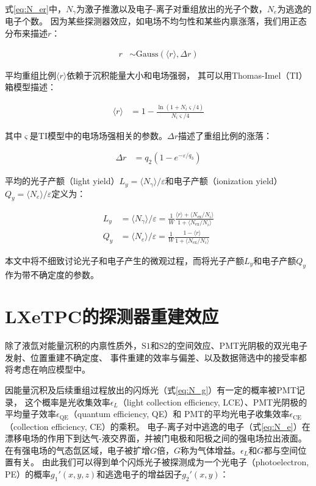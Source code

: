 式\ref{eq:N_er}中，$N_\gamma$为激子推激以及电子-离子对重组放出的光子个数，$N_{e}$为逃逸的电子个数。
因为某些探测器效应，如电场不均匀性和某些内禀涨落\cite{lux_collaboration_tritium_2016}，我们用正态分布来描述$r$：

\begin{align}
    \label{eq:r}
    r &\sim \mathrm{Gauss}\left(\langle r\rangle,\Delta r\right)
\end{align}

平均重组比例$\langle r\rangle$依赖于沉积能量大小和电场强弱，
其可以用Thomas-Imel（TI）箱模型描述\cite{thomas_recombination_1987}：

\begin{align}
    \label{eq:mr}
    \langle r\rangle &= 1 - \frac{\ln{\left(1+N_i\varsigma/4\right)}}{N_i\varsigma/4}
\end{align}

其中$\varsigma$是TI模型中的电场场强相关的参数。$\Delta r$描述了重组比例的涨落：

\begin{align}
    \label{eq:sr}
    \Delta r &= q_2\left(1-e^{-\varepsilon /q_3}\right)
\end{align}

平均的光子产额（light yield）$L_y=\langle N_\gamma\rangle/\varepsilon $和电子产额（ionization yield）$Q_y=\langle N_e\rangle/\varepsilon $定义为：

\begin{align}
    \label{eq:N_g}
    L_y &= \langle N_\gamma\rangle/\varepsilon  = \frac{1}{W}\frac{\langle r\rangle+\langle N_{\mathrm{ex}}/N_i\rangle}{1+\langle N_{\mathrm{ex}}/N_i\rangle} \\
    \label{eq:N_e}
    Q_y &= \langle N_e\rangle/\varepsilon  = \frac{1}{W}\frac{1-\langle r\rangle}{1+\langle N_{\mathrm{ex}}/N_i\rangle}
\end{align}

本文中将不细致讨论光子和电子产生的微观过程，而将光子产额$L_y$和电子产额$Q_y$作为带不确定度的参数。

\section{LXeTPC的探测器重建效应}

除了液氙对能量沉积的内禀性质外，$\mathrm{S1}$和$\mathrm{S2}$的空间效应、PMT光阴极的双光电子发射、位置重建不确定度、
事件重建的效率与偏差、以及数据筛选中的接受率都将考虑在响应模型中。

因能量沉积及后续重组过程放出的闪烁光（式\ref{eq:N_g}）有一定的概率被PMT记录，
这个概率是光收集效率$\epsilon_L$（light collection efficiency, LCE）、PMT光阴极的平均量子效率$\epsilon_{\mathrm{QE}}$（quantum efficiency, QE）和
PMT的平均光电子收集效率$\epsilon_{\mathrm{CE}}$（collection efficiency, CE）的乘积。
电子-离子对中逃逸的电子（式\ref{eq:N_e}）在漂移电场的作用下到达气-液交界面，并被门电极和阳极之间的强电场拉出液面。
在有强电场的气态氙区域，电子被扩增$G$倍，$G$称为气体增益。$\epsilon_L$和$G$都与空间位置有关。
由此我们可以得到单个闪烁光子被探测成为一个光电子（photoelectron, PE）的概率$g_1'(x,y,z)$和逃逸电子的增益因子$g_2'(x,y)$：

